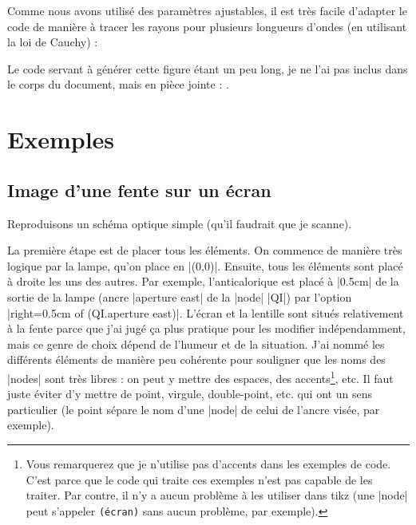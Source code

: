 \documentclass[a4paper]{ltxdoc}
\begin{document}
Comme nous avons utilisé des paramètres ajustables, il est très facile d'adapter le code de manière à tracer les rayons pour plusieurs longueurs d'ondes (en utilisant la loi de Cauchy) :

\begin{example only}
\begin{center}

\end{center}
\end{example only}
%
Le code servant à générer cette figure étant un peu long, je ne l'ai pas inclus dans le corps du document, mais en pièce jointe : .


\section{Exemples}

\subsection{Image d'une fente sur un écran}

Reproduisons un schéma optique simple (qu'il faudrait que je scanne).

La première étape est de placer tous les éléments. On commence de manière très logique par la lampe, qu'on place en |(0,0)|. Ensuite, tous les éléments sont placé à droite les uns des autres. Par exemple, l'anticalorique est placé à |0.5cm| de la sortie de la lampe (ancre |aperture east| de la |node| |QI|) par l'option |right=0.5cm of (QI.aperture east)|. L'écran et la lentille sont situés relativement à la fente parce que j'ai jugé ça plus pratique pour les modifier indépendamment, mais ce genre de choix dépend de l'humeur et de la situation. J'ai nommé les différents éléments de manière peu cohérente pour souligner que les noms des |nodes| sont très libres : on peut y mettre des espaces, des accents\footnote{Vous remarquerez que je n'utilise pas d'accents dans les exemples de code. C'est parce que le code qui traite ces exemples n'est pas capable de les traiter. Par contre, il n'y a aucun problème à les utiliser dans tikz (une |node| peut s'appeler \texttt{(écran)} sans aucun problème, par exemple).}, etc. Il faut juste éviter d'y mettre de point, virgule, double-point, etc. qui ont un sens particulier (le point sépare le nom d'une |node| de celui de l'ancre visée, par exemple).

\begin{codeexample}[width=5cm]
\end{codeexample}
\end{document}
